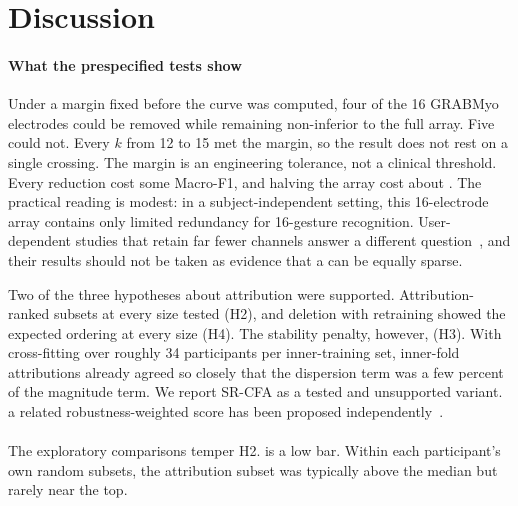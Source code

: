 \section{Discussion}
\label{sec:discussion}

\paragraph{What the prespecified tests show}
Under a margin fixed before the curve was computed, four of the 16 GRABMyo electrodes could be removed while remaining non-inferior to the full array. Five could not. Every $k$ from 12 to 15 met the margin, so the result does not rest on a single  crossing. The margin is an engineering tolerance, not a clinical threshold. Every reduction cost some Macro-F1, and halving the array cost about \DeltaKEight. The practical reading is modest: in a subject-independent setting, this 16-electrode  array contains only limited redundancy for 16-gesture recognition. User-dependent studies that retain far fewer channels answer a different question~\cite{phinyomark2018emg,qu2021reduce}, and their results should not be taken as evidence that a  can be equally sparse.

Two of the three hypotheses about attribution were supported. Attribution-ranked subsets  at every size tested (H2), and deletion with retraining showed the expected ordering at every size (H4).  The stability penalty, however,  (H3). With cross-fitting over roughly 34 participants per inner-training set, inner-fold attributions already agreed so closely that the dispersion term was a few percent of the magnitude term.  We report SR-CFA as a tested and unsupported variant.  a related robustness-weighted score has been proposed independently~\cite{xiang2026roshap}.

\paragraph{}
The exploratory comparisons temper H2.  is a low bar.  Within each participant's own random subsets, the attribution subset was typically above the median but rarely near the top. 

